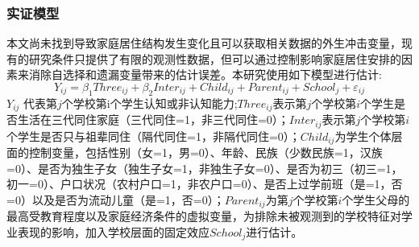 \documentclass{beamer}
\begin{document}
\begin{frame}
	\frametitle{实证模型}
	本文尚未找到导致家庭居住结构发生变化且可以获取相关数据的外生冲击变量，现有的研究条件只提供了有限的观测性数据，但可以通过控制影响家庭居住安排的因素来消除自选择和遗漏变量带来的估计误差。本研究使用如下模型进行估计:
\begin{equation}
	Y_{ij}=\beta_1Three_{ij}+\beta_2Inter_{ij}+Child_{ij}+Parent_{ij}+School_j+\varepsilon_{ij}
\end{equation}
$Y_{ij}$ 代表第$j$个学校第i个学生认知或非认知能力;$Three_{ij}$表示第$j$个学校第$i$个学生是否生活在三代同住家庭（三代同住=1，非三代同住=0）；$Inter_{ij}$表示第$j$个学校第$i$个学生是否只与祖辈同住（隔代同住=1，非隔代同住=0）；$Child_{ij}$为学生个体层面的控制变量，包括性别（女=1，男=0）、年龄、民族（少数民族=1，汉族=0）、是否为独生子女（独生子女=1，非独生子女=0）、是否为初三（初三=1，初一=0）、户口状况（农村户口=1，非农户口=0）、是否上过学前班（是=1，否=0）以及是否为流动儿童（是=1，否=0）；$Parent_{ij}$为第$j$个学校第$i$个学生父母的最高受教育程度以及家庭经济条件的虚拟变量，为排除未被观测到的学校特征对学业表现的影响，加入学校层面的固定效应$School_j$进行估计。 
\end{frame}
\end{document}
